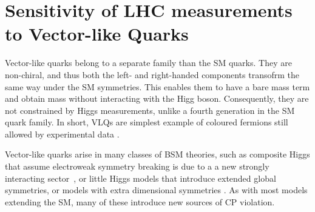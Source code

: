 \section{Sensitivity of LHC measurements to Vector-like Quarks}
\label{sec:VLQ}
Vector-like quarks belong to a separate family than the SM quarks. They are non-chiral, and thus both the left- and right-handed components transofrm the same way under the SM symmetries. This enables them to have a bare mass term and obtain mass without interacting with the Higg boson. Consequently, they are not constrained by Higgs measurements, unlike a fourth generation in the SM quark family. In short, VLQs are simplest example of coloured fermions still allowed by experimental data \cite{Aguilar_Saavedra_2013}. 

Vector-like quarks arise in many classes of BSM theories, such as composite Higgs that assume electroweak symmetry breaking is due to a a new strongly interacting sector~\cite{witzel2019review}, or little Higgs models that introduce extended global symmetries, or models with extra dimensional symmetries . As with most models extending the SM, many of these introduce new sources of CP violation.

